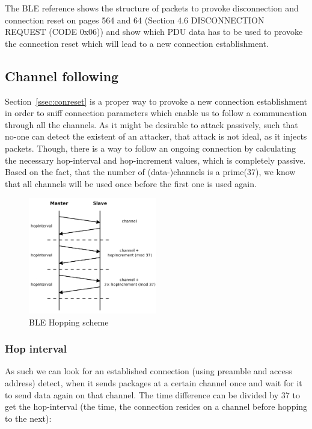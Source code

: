 \documentclass[conference]{IEEEtran}
\begin{document}
The BLE reference shows the structure of packets to provoke disconnection and connection reset on pages 564 and 64 (Section 4.6 DISCONNECTION REQUEST (CODE 0x06)) and show which PDU data has to be used to provoke the connection reset which will lead to a new connection establishment.\cite[p. 564]{ble40}

\subsection{Channel following}
\label{channelfollowing}

Section~\ref{ssec:conreset} is a proper way to provoke a new connection establishment in order to sniff connection parameters which enable us to follow a communcation through all the channels. As it might be desirable to attack passively, such that no-one can detect the existent of an attacker, that attack is not ideal, as it injects packets. Though, there is a way to follow an ongoing connection by calculating the necessary hop-interval and hop-increment values, which is completely passive. Based on the fact, that the number of (data-)channels is a prime(37), we know that all channels will be used once before the first one is used again.

\begin{figure}
  \centering
    \includegraphics[width=0.5\textwidth]{hopping}
    \caption{BLE Hopping scheme \cite{lowenergylowsecurity} }
  \label{fig:hopping}
\end{figure}

\subsubsection{Hop interval}
\label{ssub:hop_interval}

As such we can look for an established connection (using preamble and access address) detect, when it sends packages at a certain channel once and wait for it to send data again on that channel. The time difference can be divided by 37 to get the hop-interval (the time, the connection resides on a channel before hopping to the next):
\end{document}
